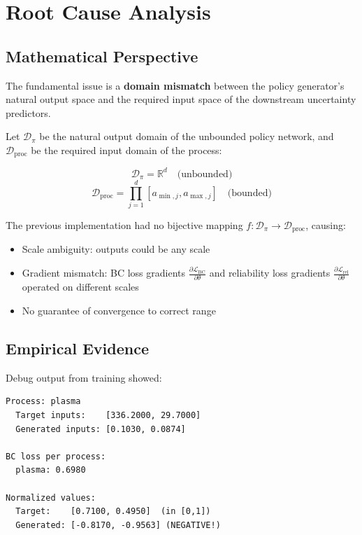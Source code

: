 \documentclass[11pt,a4paper]{article}
\begin{document}
\section{Root Cause Analysis}

\subsection{Mathematical Perspective}

The fundamental issue is a \textbf{domain mismatch} between the policy generator's natural output space and the required input space of the downstream uncertainty predictors.

Let $\mathcal{D}_\pi$ be the natural output domain of the unbounded policy network, and $\mathcal{D}_{\text{proc}}$ be the required input domain of the process:

\begin{equation}
\mathcal{D}_\pi = \mathbb{R}^d \quad \text{(unbounded)}
\end{equation}
\begin{equation}
\mathcal{D}_{\text{proc}} = \prod_{j=1}^d [a_{\min,j}, a_{\max,j}] \quad \text{(bounded)}
\end{equation}

The previous implementation had no bijective mapping $f: \mathcal{D}_\pi \to \mathcal{D}_{\text{proc}}$, causing:
\begin{itemize}
    \item Scale ambiguity: outputs could be any scale
    \item Gradient mismatch: BC loss gradients $\frac{\partial \mathcal{L}_{\text{BC}}}{\partial \theta}$ and reliability loss gradients $\frac{\partial \mathcal{L}_{\text{rel}}}{\partial \theta}$ operated on different scales
    \item No guarantee of convergence to correct range
\end{itemize}

\subsection{Empirical Evidence}

Debug output from training showed:

\begin{verbatim}
Process: plasma
  Target inputs:    [336.2000, 29.7000]
  Generated inputs: [0.1030, 0.0874]

BC loss per process:
  plasma: 0.6980

Normalized values:
  Target:    [0.7100, 0.4950]  (in [0,1])
  Generated: [-0.8170, -0.9563] (NEGATIVE!)
\end{verbatim}
\end{document}
